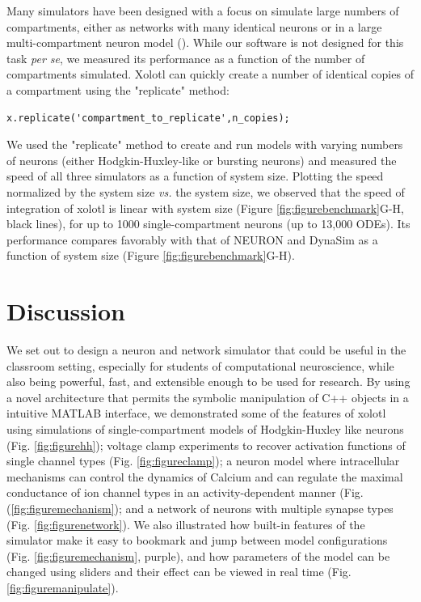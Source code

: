 \documentclass{frontiersSCNS} %
\begin{document}
Many simulators have been designed with a focus on simulate large numbers of compartments, either as networks with many identical neurons or in a large multi-compartment neuron model (\cite{bretteSimulationNetworksSpiking2007, sherfeyDynaSimMATLABToolbox2018, vitayANNarchyCodeGeneration2015, delormeSpikeNETEventdrivenSimulation2003}). While our software is not designed for this task {\em per se}, we measured its performance as a function of the number of compartments simulated. Xolotl can quickly create a number of identical copies of a compartment using the "replicate" method: 

\begin{lstlisting}[style=Matlab-editor]
x.replicate('compartment_to_replicate',n_copies); 
\end{lstlisting}

We used the "replicate" method to create and run models with varying numbers of neurons (either Hodgkin-Huxley-like or bursting neurons) and measured the speed of all three simulators as a function of system size. Plotting the speed normalized by the system size {\em vs.} the system size, we observed that the speed of integration of xolotl is linear with system size (Figure \ref{fig:figurebenchmark}G-H, black lines), for up to 1000 single-compartment neurons (up to 13,000 ODEs). Its performance compares favorably with that of NEURON and DynaSim as a function of system size (Figure \ref{fig:figurebenchmark}G-H).


%
%
%
%
%
%

\section{Discussion}
\label{discussion}

We set out to design a neuron and network simulator that could be useful in the classroom setting, especially for students of computational neuroscience, while also being powerful, fast, and extensible enough to be used for research. By using a novel architecture that permits the symbolic manipulation of C++ objects in a intuitive MATLAB interface, we demonstrated some of the features of xolotl using simulations of single-compartment models of Hodgkin-Huxley like neurons (Fig. \ref{fig:figurehh}); voltage clamp experiments to recover activation functions of single channel types (Fig. \ref{fig:figureclamp}); a neuron model where intracellular mechanisms can control the dynamics of Calcium and can regulate the maximal conductance of ion channel types in an activity-dependent manner (Fig. (\ref{fig:figuremechanism}); and a network of neurons with multiple synapse types (Fig. \ref{fig:figurenetwork}). We also illustrated how built-in features of the simulator make it easy to bookmark and jump between model configurations (Fig. \ref{fig:figuremechanism}, purple), and how parameters of the model can be changed using sliders and their effect can be viewed in real time (Fig. \ref{fig:figuremanipulate}). 
\end{document}

